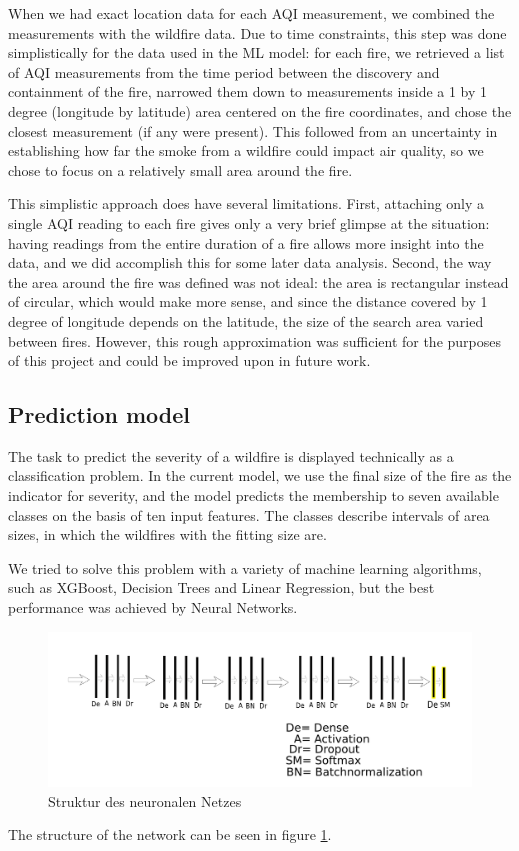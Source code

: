 \documentclass[a4paper,12pt]{article}
\begin{document}
When we had exact location data for each AQI measurement, we combined the measurements with the wildfire data. Due to time constraints, this step was done simplistically for the data used in the ML model: for each fire, we retrieved a list of AQI measurements from the time period between the discovery and containment of the fire, narrowed them down to measurements inside a 1 by 1 degree (longitude by latitude) area centered on the fire coordinates, and chose the closest measurement (if any were present). This followed from an uncertainty in establishing how far the smoke from a wildfire could impact air quality, so we chose to focus on a relatively small area around the fire.

This simplistic approach does have several limitations. First, attaching only a single AQI reading to each fire gives only a very brief glimpse at the situation: having readings from the entire duration of a fire allows more insight into the data, and we did accomplish this for some later data analysis. Second, the way the area around the fire was defined was not ideal: the area is rectangular instead of circular, which would make more sense, and since the distance covered by 1 degree of longitude depends on the latitude, the size of the search area varied between fires. However, this rough approximation was sufficient for the purposes of this project and could be improved upon in future work.

\subsection{Prediction model}

The task to predict the severity of a wildfire is displayed technically as a classification problem. In the current model, we use the final size of the fire as the indicator for severity, and the model predicts the membership to seven available classes on the basis of ten input features. The classes describe intervals of area sizes, in which the wildfires with the fitting size are.

We tried to solve this problem with a variety of machine learning algorithms, such as XGBoost, Decision Trees and Linear Regression, but the best performance was achieved by Neural Networks.

\begin{figure}[t]
	\centering	
	\includegraphics[scale=0.75]{nn.pdf}	
	\caption[Struktur des neuronalen Netzes]{Struktur des neuronalen Netzes}
	\label{network_structure}
\end{figure}
The structure of the network can be seen in figure \ref{network_structure}.
\end{document}
